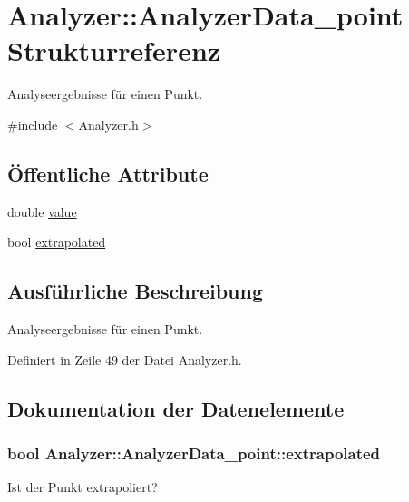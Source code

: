 \hypertarget{structAnalyzer_1_1AnalyzerData__point}{\section{Analyzer\-:\-:Analyzer\-Data\-\_\-point Strukturreferenz}
\label{structAnalyzer_1_1AnalyzerData__point}
}


Analyseergebnisse für einen Punkt.  




{\ttfamily \#include $<$Analyzer.\-h$>$}

\subsection*{Öffentliche Attribute}
\begin{DoxyCompactItemize}
\item 
double \hyperlink{structAnalyzer_1_1AnalyzerData__point_a150b00a3d0be5d1c75b39292d213cbfa}{value}
\item 
bool \hyperlink{structAnalyzer_1_1AnalyzerData__point_af4d2c2bd41aebc3c243afc5544bed81a}{extrapolated}
\end{DoxyCompactItemize}


\subsection{Ausführliche Beschreibung}
Analyseergebnisse für einen Punkt. 

Definiert in Zeile 49 der Datei Analyzer.\-h.



\subsection{Dokumentation der Datenelemente}
\hypertarget{structAnalyzer_1_1AnalyzerData__point_af4d2c2bd41aebc3c243afc5544bed81a}{
\subsubsection[{extrapolated}]{\setlength{\rightskip}{0pt plus 5cm}bool Analyzer\-::\-Analyzer\-Data\-\_\-point\-::extrapolated}}\label{structAnalyzer_1_1AnalyzerData__point_af4d2c2bd41aebc3c243afc5544bed81a}
Ist der Punkt extrapoliert? 

